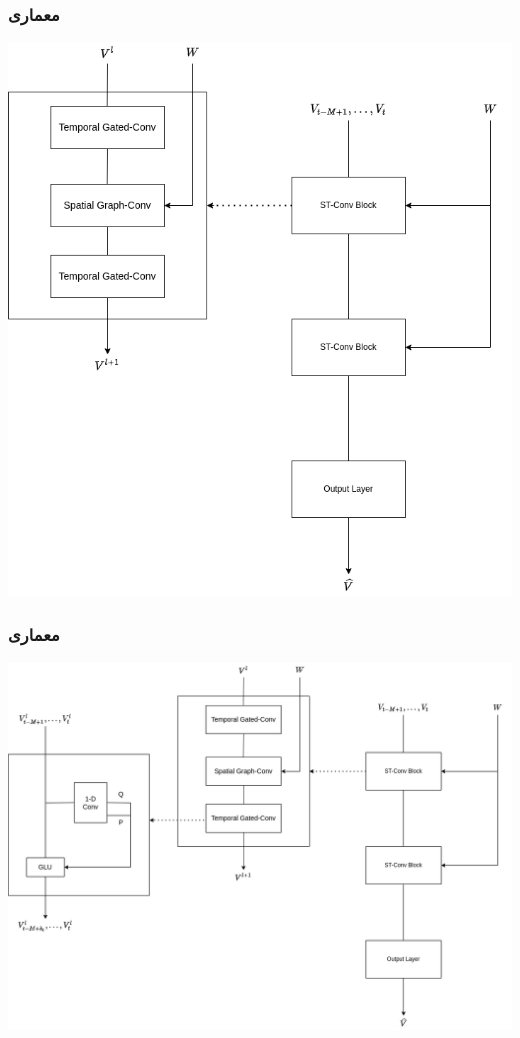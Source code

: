 \documentclass{beamer}
\begin{document}
\begin{frame}
  \frametitle{معماری}
  \includegraphics[height=.8\textheight]{img/arch-2.png}
\end{frame}

\begin{frame}
  \frametitle{معماری}
  \includegraphics[height=.8\textheight]{img/arch.png}
\end{frame}
\end{document}
